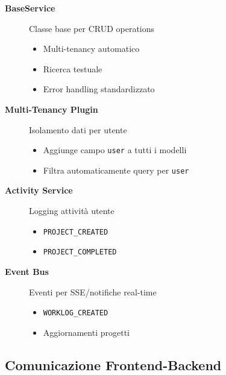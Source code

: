 \documentclass[11pt,a4paper]{article}
\begin{document}
\begin{description}
    \item[\textbf{BaseService}] Classe base per CRUD operations
    \begin{itemize}
        \item Multi-tenancy automatico
        \item Ricerca testuale
        \item Error handling standardizzato
    \end{itemize}
    
    \item[\textbf{Multi-Tenancy Plugin}] Isolamento dati per utente
    \begin{itemize}
        \item Aggiunge campo \texttt{user} a tutti i modelli
        \item Filtra automaticamente query per \texttt{user}
    \end{itemize}
    
    \item[\textbf{Activity Service}] Logging attività utente
    \begin{itemize}
        \item \texttt{PROJECT\_CREATED}
        \item \texttt{PROJECT\_COMPLETED}
    \end{itemize}
    
    \item[\textbf{Event Bus}] Eventi per SSE/notifiche real-time
    \begin{itemize}
        \item \texttt{WORKLOG\_CREATED}
        \item Aggiornamenti progetti
    \end{itemize}
\end{description}

\subsection{Comunicazione Frontend-Backend}
\end{document}
